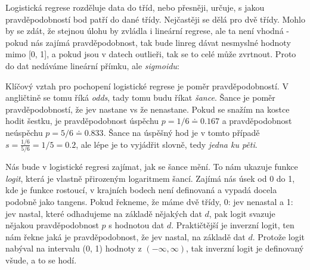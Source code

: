 Logistická regrese rozděluje data do tříd, nebo přesněji, určuje, s jakou pravděpodobností bod patří do dané třídy. Nejčastěji se dělá pro dvě třídy. Mohlo by se zdát, že stejnou úlohu by zvládla i lineární regrese, ale ta není vhodná - pokud nás zajímá pravděpodobnost, tak bude linreg dávat nesmyslné hodnoty mimo [0, 1], a pokud jsou v datech outlieři, tak se to celé může zvrtnout. Proto do dat nedáváme lineární přímku, ale \textit{sigmoidu}:

\begin{figure}[ht!]
\centering
{}
\end{figure}

Klíčový vztah pro pochopení logistické regrese je poměr pravděpodobností. V angličtině se tomu říká \textit{odds}, tady tomu budu říkat \textit{šance}. Šance je poměr pravděpodobností, že jev nastane vs že nenastane. Pokud se snažím na kostce hodit šestku, je pravděpodobnost úspěchu $p=1/6 \doteq 0.167$ a pravděpodobnost neúspěchu $p = 5/6 \doteq 0.833$. Šance na úspěšný hod je v tomto případě $s = \frac{1/6}{5/6} = 1/5 = 0.2$, ale lépe je to vyjádřit slovně, tedy \textit{jedna ku pěti}.

Nás bude v logistické regresi zajímat, jak se šance mění. To nám ukazuje funkce \textit{logit}, která je vlastně přirozeným logaritmem šancí. Zajímá nás úsek od 0 do 1, kde je funkce rostoucí, v krajních bodech není definovaná a vypadá docela podobně jako tangens. Pokud řekneme, že máme dvě třídy, 0: jev nenastal a 1: jev nastal, které odhadujeme na základě nějakých dat $d$, pak logit svazuje nějakou pravděpodobnost $p$ s hodnotou dat $d$. Praktičtější je inverzní logit, ten nám řekne jaká je pravděpodobnost, že jev nastal, na základě dat $d$. Protože logit nabýval na intervalu (0, 1) hodnoty z $(-\infty, \infty)$, tak inverzní logit je definovaný všude, a to se hodí.

